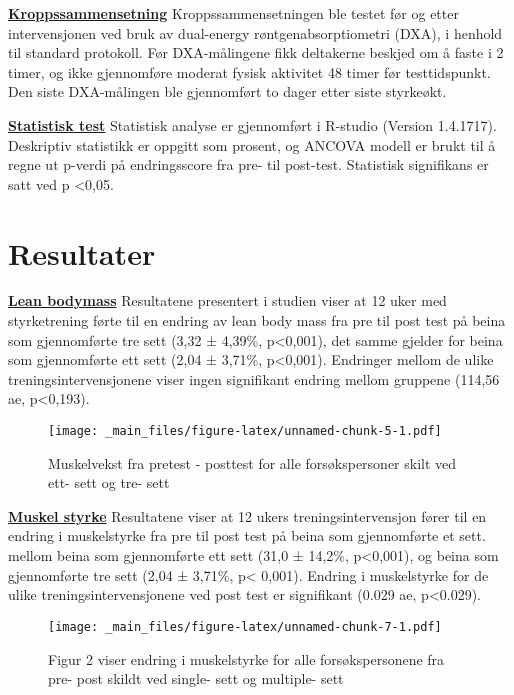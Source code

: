 \documentclass[
]{book}
\begin{document}
\underline{\textbf{Kroppssammensetning}}
Kroppssammensetningen ble testet før og etter intervensjonen ved bruk av dual-energy røntgenabsorptiometri (DXA), i henhold til standard protokoll. Før DXA-målingene fikk deltakerne beskjed om å faste i 2 timer, og ikke gjennomføre moderat fysisk aktivitet 48 timer før testtidspunkt. Den siste DXA-målingen ble gjennomført to dager etter siste styrkeøkt.

\underline{\textbf{Statistisk test}}
Statistisk analyse er gjennomført i R-studio (Version 1.4.1717). Deskriptiv statistikk er oppgitt som prosent, og ANCOVA modell er brukt til å regne ut p-verdi på endringsscore fra pre- til post-test. Statistisk signifikans er satt ved p \textless0,05.

\hypertarget{resultater-1}{%
\section{Resultater}\label{resultater-1}}

\underline{\textbf{Lean bodymass}}
Resultatene presentert i studien viser at 12 uker med styrketrening førte til en endring av lean body mass fra pre til post test på beina som gjennomførte tre sett (3,32 ± 4,39\%, p\textless0,001), det samme gjelder for beina som gjennomførte ett sett (2,04 ± 3,71\%, p\textless0,001). Endringer mellom de ulike treningsintervensjonene viser ingen signifikant endring mellom gruppene (114,56 ae, p\textless0,193).

\begin{figure}
\centering
\texttt{[image: \_main\_files/figure-latex/unnamed-chunk-5-1.pdf]}
\caption{\label{fig:unnamed-chunk-5}Muskelvekst fra pretest - posttest for alle forsøkspersoner skilt ved ett- sett og tre- sett}
\end{figure}

\underline{\textbf{Muskel styrke}}
Resultatene viser at 12 ukers treningsintervensjon fører til en endring i muskelstyrke fra pre til post test på beina som gjennomførte et sett. mellom beina som gjennomførte ett sett (31,0 ± 14,2\%, p\textless0,001), og beina som gjennomførte tre sett (2,04 ± 3,71\%, p\textless{} 0,001). Endring i muskelstyrke for de ulike treningsintervensjonene ved post test er signifikant (0.029 ae, p\textless0.029).

\begin{figure}
\centering
\texttt{[image: \_main\_files/figure-latex/unnamed-chunk-7-1.pdf]}
\caption{\label{fig:unnamed-chunk-7}Figur 2 viser endring i muskelstyrke for alle forsøkspersonene fra pre- post skildt ved single- sett og multiple- sett}
\end{figure}
\end{document}
